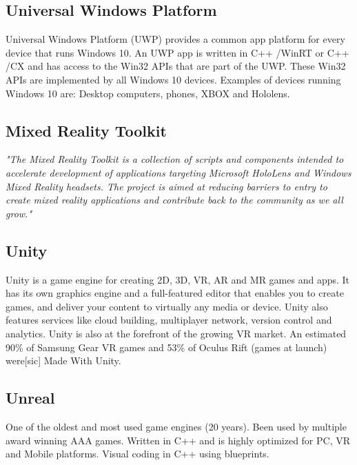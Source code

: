         \subsection{Universal Windows Platform}
            Universal Windows Platform (UWP) provides a common app platform for every device that runs Windows 10. An UWP app is written in C++ /WinRT or C++ /CX and has access to the Win32 APIs that are part of the UWP. These Win32 APIs are implemented by all Windows 10 devices.\cite{wdc-UWP} Examples of devices running Windows 10 are: Desktop computers, phones, XBOX and Hololens.
        
        \subsection{Mixed Reality Toolkit}
            \emph{"The Mixed Reality Toolkit is a collection of scripts and components intended to accelerate development of applications targeting Microsoft HoloLens and Windows Mixed Reality headsets. The project is aimed at reducing barriers to entry to create mixed reality applications and contribute back to the community as we all grow."}\cite{MRToolkitReadme}
    
        \subsection{Unity}
            Unity is a game engine for creating 2D, 3D, VR, AR and MR games and apps. It has its own graphics engine and a full-featured editor that enables you to create games, and deliver your content to virtually any media or device. Unity also features services like cloud building, multiplayer network, version control and analytics. Unity is also at the forefront of the growing VR market. An estimated 90\% of Samsung Gear VR games and 53\% of Oculus Rift (games at launch) were[sic] Made With Unity. \cite{UnityAbout}
        
        \subsection{Unreal}
            One of the oldest and most used game engines (20 years). Been used by multiple award winning AAA games. Written in C++ and is highly optimized for PC, VR and Mobile platforms.
            Visual coding in C++ using blueprints.
    
